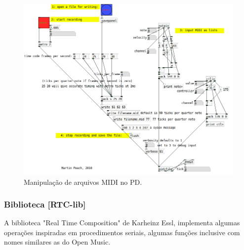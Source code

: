 \documentclass[
	12pt,				%
	openright,			%
	twoside,			%
	a4paper,			%
	english,			%
	french,				%
	spanish,			%
	brazil				%
	]{abntex2}
\begin{document}
\begin{figure}[!h]
	\caption{\label{fig_grafico}Manipulação de arquivos MIDI no PD.}
	\begin{center}
	    \includegraphics[scale=0.6]{OMPD/PD-midifile_write_-mrpeach.png}
	\end{center}
\end{figure}





\subsubsection{Biblioteca [RTC-lib]}


A biblioteca "Real Time Composition" de Karheinz Essl, implementa algumas operações inspiradas em procedimentos seriais, algumas funções inclusive com nomes similares as do Open Music.
\end{document}
